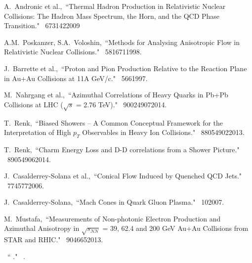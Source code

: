 \begin{thebibliography}{1000}
A.~Andronic et al.,~``Thermal Hadron Production in Relativistic Nuclear Collisions: The Hadron Mass Spectrum, the Horn, and the QCD Phase Transition." \Journal{\PLB} {~673}{142}{2009}

A.M.~Poskanzer, S.A.~Voloshin,~``Methods for Analysing Anisotropic Flow in Relativistic Nuclear Collisions." \Journal{\PRC} {~58}{1671}{1998}.

J.~Barrette et al.,~``Proton and Pion Production Relative to the Reaction Plane in Au+Au Collisions at 11A GeV/c." \Journal{\PRC} {~56}{6}{1997}.

M.~Nahrgang et al.,~``Azimuthal Correlations of Heavy Quarks in Pb+Pb Collisions at LHC ($\sqrt{s}$ = 2.76 TeV)." \Journal{\PRC} {~90}{024907}{2014}.

T.~Renk,~``Biased Showers -- A Common Conceptual Framework for the Interpretation of High $p_T$ Observables in Heavy Ion Collisions." \Journal{\PRC} {~88}{054902}{2013}.

T.~Renk,~``Charm Energy Loss and D-D correlations from a Shower Picture." \Journal{\PRC} {~89}{054906}{2014}.

J.~Casalderrey-Solana et al.,~``Conical Flow Induced by Quenched QCD Jets." \Journal{\NPA} {~774}{577}{2006}.

J.~Casalderrey-Solana,~``Mach Cones in Quark Gluon Plasma." \Journal{\JPG} {~10}{}{2007}.

M.~Mustafa,~``Measurements of Non-photonic Electron Production and Azimuthal Anisotropy in $\sqrt{s_{NN}}$ = 39, 62.4 and 200 GeV Au+Au Collisions from STAR and RHIC." \Journal{\NPA} {~904}{665}{2013}.

\bibitem{}
~`` ." \Journal{} {~}{}{}.

\end{thebibliography}
